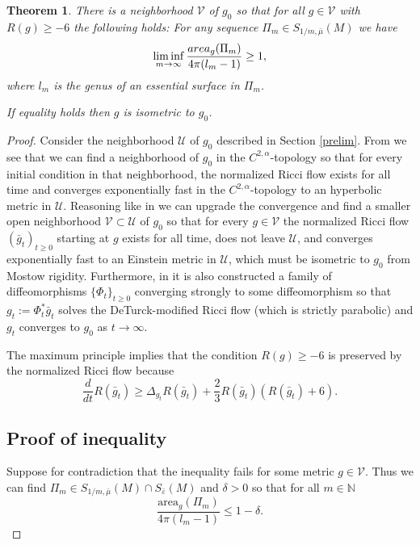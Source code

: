 \documentclass[11pt]{amsart}
\def\N{\mathbb N}
\newtheorem{thm}{Theorem}[section]
\theoremstyle{remark}
\theoremstyle{definition}
\begin{document}
{{	\begin{thm}\label{asympt.thm} There is a neighborhood $\mathcal V$ of $g_0$ so that for all $g\in \mathcal V$ with $R(g)\geq -6$ the following holds:
		For any sequence  $\Pi_m\in {S_{1/m,\bar \mu}(M)}$ we have
		$$\liminf_{m\to\infty}\frac{{\rm area}_g(\Pi_m)}{4\pi(l_m-1)}\geq 1,$$
		where $l_m$ is the genus of an essential surface in $\Pi_m$.
		
		If equality holds then $g$ is isometric to $g_0$.
	\end{thm}
	
	\begin{proof}
		
		
		Consider the neighborhood $\mathcal U$ of $g_0$ described in Section \ref{prelim}. From \cite[Appendix A]{knopf} we see that we can find  a neighborhood  of $g_0$ in the $C^{2,\alpha}$-topology so that for every initial condition  in that neighborhood, the normalized Ricci flow exists for all time and converges exponentially fast  in the $C^{2,\alpha}$-topology to an hyperbolic metric in $\mathcal U$. Reasoning like in \cite[Section 17]{hamilton} we can upgrade the convergence and find a  smaller open neighborhood $\mathcal V\subset {\mathcal U}$ of $g_0$  so that for every $g\in \mathcal V$ the normalized Ricci flow $(\bar g_t)_{t\geq 0}$
		starting at $g$ exists for all time, does not leave $\mathcal U$, and converges  exponentially fast to an Einstein metric in $\mathcal U$, which must be isometric to $g_0$ from Mostow rigidity.  Furthermore, in \cite{knopf} it is also constructed a family of diffeomorphisms $\{\Phi_t\}_{t\geq 0}$ converging strongly to some diffeomorphism so that  $g_t:=\Phi_t^*\bar g_t$ solves the DeTurck-modified Ricci flow (which is strictly parabolic) and $g_t$ converges to $g_0$ as $t\to\infty$.
		
		
		The maximum principle implies that the condition $R(g)\geq -6$ is preserved by the normalized Ricci flow because
		$$\frac{d}{dt}R(\bar g_t)\geq \Delta_{g_t}R(\bar g_t)+\frac{2}{3}R(\bar g_t)(R(\bar g_t)+6).$$
		
		
		\subsection{Proof of inequality} Suppose for contradiction that the inequality fails for some metric $g\in \mathcal V$.  Thus we can find  $\Pi_m\in S_{1/m,\bar \mu}(M)\cap S_{\bar\varepsilon}(M)$ and $\delta>0$  so that for all $m\in \N$
		$$\frac{\text{area}_g(\Pi_m)}{4\pi(l_m-1)} \leq 1-\delta.$$
		

\end{proof}}}
\end{document}
